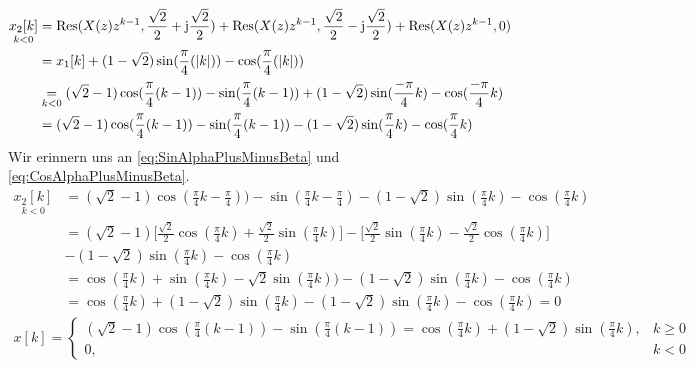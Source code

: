 \documentclass[11pt,a4paper,DIV=12]{scrartcl}
\begin{document}
\begin{align}
	\underset{k<0}{x_2[k]}&=\mathrm{Res}(X(z)z^{k-1},\frac{\sqrt{2}}{2}+\im\frac{\sqrt{2}}{2})+\mathrm{Res}(X(z)z^{k-1},\frac{\sqrt{2}}{2}-\im\frac{\sqrt{2}}{2})+\mathrm{Res}(X(z)z^{k-1},0)\nonumber\\
	&=x_1[k]+(1-\sqrt{2})\sin(\frac{\pi}{4}(|k|))-\cos(\frac{\pi}{4}(|k|))\nonumber \\
	&\underset{k<0}{=}(\sqrt{2}-1)\cos(\frac{\pi}{4}(k-1))-\sin(\frac{\pi}{4}(k-1))+(1-\sqrt{2})\sin(\frac{-\pi}{4}k)-\cos(\frac{-\pi}{4}k)\nonumber\\
	&=(\sqrt{2}-1)\cos(\frac{\pi}{4}(k-1))-\sin(\frac{\pi}{4}(k-1))-(1-\sqrt{2})\sin(\frac{\pi}{4}k)-\cos(\frac{\pi}{4}k)
\end{align}
Wir erinnern uns an \eqref{eq:SinAlphaPlusMinusBeta} und \eqref{eq:CosAlphaPlusMinusBeta}.
\begin{align}
	\underset{k<0}{x_2[k]}&=(\sqrt{2}-1)\cos(\frac{\pi}{4}k-\frac{\pi}{4}))-\sin(\frac{\pi}{4}k-\frac{\pi}{4})-(1-\sqrt{2})\sin(\frac{\pi}{4}k)-\cos(\frac{\pi}{4}k)\nonumber\\
	&=(\sqrt{2}-1)\bigg[\frac{\sqrt{2}}{2}\cos(\frac{\pi}{4}k)+\frac{\sqrt{2}}{2}\sin(\frac{\pi}{4}k)\bigg]-\bigg[\frac{\sqrt{2}}{2}\sin(\frac{\pi}{4}k)-\frac{\sqrt{2}}{2}\cos(\frac{\pi}{4}k)\bigg]\nonumber\\
	&-(1-\sqrt{2})\sin(\frac{\pi}{4}k)-\cos(\frac{\pi}{4}k)\nonumber\\
	&=\cos(\frac{\pi}{4}k)+\sin(\frac{\pi}{4}k)-\sqrt{2}\sin(\frac{\pi}{4}k))-(1-\sqrt{2})\sin(\frac{\pi}{4}k)-\cos(\frac{\pi}{4}k)\nonumber\\
	&=\cos(\frac{\pi}{4}k)+(1-\sqrt{2})\sin(\frac{\pi}{4}k)-(1-\sqrt{2})\sin(\frac{\pi}{4}k)-\cos(\frac{\pi}{4}k)=0
\end{align}
\begin{align}
	x[k]=\begin{cases}
		(\sqrt{2}-1)\cos(\frac{\pi}{4}(k-1))-\sin(\frac{\pi}{4}(k-1))=\cos(\frac{\pi}{4}k)+(1-\sqrt{2})\sin(\frac{\pi}{4}k), &k\geq0\\
		0, &k<0
	\end{cases}
\end{align}
\end{document}
